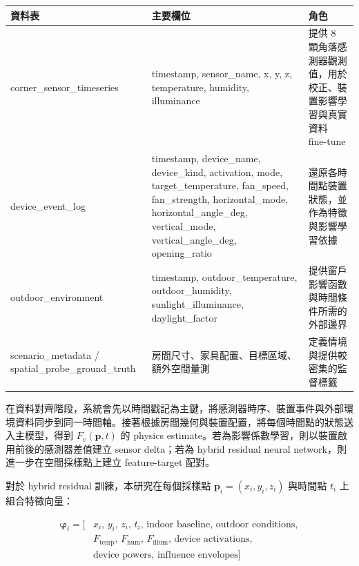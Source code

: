 \documentclass[12pt,a4paper]{article}
\begin{document}
\begin{table}[htbp]
\centering
\footnotesize
\renewcommand{\arraystretch}{1.25}
\begin{tabular}{|>{\raggedright\arraybackslash}p{}|>{\raggedright\arraybackslash}p{}|>{\raggedright\arraybackslash}p{}|}
\hline
\textbf{資料表} & \textbf{主要欄位} & \textbf{角色} \\
\hline
corner\_\allowbreak{}sensor\_\allowbreak{}timeseries & timestamp, sensor\_\allowbreak{}name, x, y, z, temperature, humidity, illuminance & 提供 8 顆角落感測器觀測值，用於校正、裝置影響學習與真實資料 fine-tune \\
\hline
device\_\allowbreak{}event\_\allowbreak{}log & timestamp, device\_\allowbreak{}name, device\_\allowbreak{}kind, activation, mode, target\_\allowbreak{}temperature, fan\_\allowbreak{}speed, fan\_\allowbreak{}strength, horizontal\_\allowbreak{}mode, horizontal\_\allowbreak{}angle\_\allowbreak{}deg, vertical\_\allowbreak{}mode, vertical\_\allowbreak{}angle\_\allowbreak{}deg, opening\_\allowbreak{}ratio & 還原各時間點裝置狀態，並作為特徵與影響學習依據 \\
\hline
outdoor\_\allowbreak{}environment & timestamp, outdoor\_\allowbreak{}temperature, outdoor\_\allowbreak{}humidity, sunlight\_\allowbreak{}illuminance, daylight\_\allowbreak{}factor & 提供窗戶影響函數與時間條件所需的外部邊界 \\
\hline
scenario\_\allowbreak{}metadata / spatial\_\allowbreak{}probe\_\allowbreak{}ground\_\allowbreak{}truth & 房間尺寸、家具配置、目標區域、額外空間量測 & 定義情境與提供較密集的監督標籤 \\
\hline
\end{tabular}
\end{table}

在資料對齊階段，系統會先以時間戳記為主鍵，將感測器時序、裝置事件與外部環境資料同步到同一時間軸。接著根據房間幾何與裝置配置，將每個時間點的狀態送入主模型，得到 $F_v(\mathbf{p},t)$ 的 physics estimate。若為影響係數學習，則以裝置啟用前後的感測器差值建立 sensor delta；若為 hybrid residual neural network，則進一步在空間採樣點上建立 feature-target 配對。


對於 hybrid residual 訓練，本研究在每個採樣點 $\mathbf{p}_i=(x_i, y_i, z_i)$ 與時間點 $t_i$ 上組合特徵向量：


\[
\begin{aligned}\boldsymbol{\varphi}_i = [&x_i,\, y_i,\, z_i,\, t_i,\, \text{indoor baseline},\, \text{outdoor conditions},\\&F_{\text{temp}},\, F_{\text{hum}},\, F_{\text{illum}},\, \text{device activations},\\&\text{device powers},\, \text{influence envelopes}]\end{aligned}
\]
\end{document}
